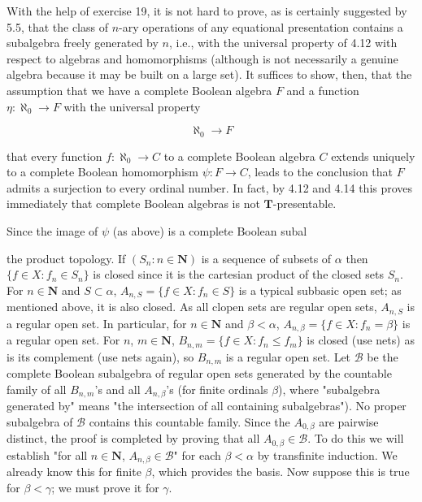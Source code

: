 With the help of exercise 19, it is not hard to prove, as is certainly suggested by 5.5, that the class of $n$-ary operations of any equational presentation contains a subalgebra freely generated by $n$, i.e., with the universal property of 4.12 with respect to algebras and homomorphisms (although is not necessarily a genuine algebra because it may be built on a large set). It suffices to show, then, that the assumption that we have a complete Boolean algebra $F$ and a function $\eta: \aleph_0 \longrightarrow F$ with the universal property

$$\aleph_0 \longrightarrow F$$

that every function $f: \aleph_0 \longrightarrow C$ to a complete Boolean algebra $C$ extends uniquely to a complete Boolean homomorphism $\psi: F \longrightarrow C$, leads to the conclusion that $F$ admits a surjection to every ordinal number. In fact, by 4.12 and 4.14 this proves immediately that complete Boolean algebras is not $\mathbf{T}$-presentable.

Since the image of $\psi$ (as above) is a complete Boolean subal

the product topology. If $(S_n:n \in \mathbf{N})$ is a sequence of subsets of $\alpha$ then $\{f \in X : f_n \in S_n\}$ is closed since it is the cartesian product of the closed sets $S_n$. For $n \in \mathbf{N}$ and $S \subset \alpha$, $A_{n,S} = \{f \in X : f_n \in S\}$ is a typical subbasic open set; as mentioned above, it is also closed. As all clopen sets are regular open sets, $A_{n,S}$ is a regular open set. In particular, for $n \in \mathbf{N}$ and $\beta < \alpha$, $A_{n,\beta} = \{f \in X : f_n = \beta\}$ is a regular open set. For $n$, $m \in \mathbf{N}$, $B_{n,m} = \{f \in X : f_n \leq f_m\}$ is closed (use nets) as is its complement (use nets again), so $B_{n,m}$ is a regular open set. Let $\mathcal{B}$ be the complete Boolean subalgebra of regular open sets generated by the countable family of all $B_{n,m}$'s and all $A_{n,\beta}$'s (for finite ordinals $\beta$), where "subalgebra generated by" means "the intersection of all containing subalgebras"). No proper subalgebra of $\mathcal{B}$ contains this countable family. Since the $A_{0,\beta}$ are pairwise distinct, the proof is completed by proving that all $A_{0,\beta} \in \mathcal{B}$. To do this we will establish "for all $n \in \mathbf{N}$, $A_{n,\beta} \in \mathcal{B}$" for each $\beta < \alpha$ by transfinite induction. We already know this for finite $\beta$, which provides the basis. Now suppose this is true for $\beta < \gamma$; we must prove it for $\gamma$.

